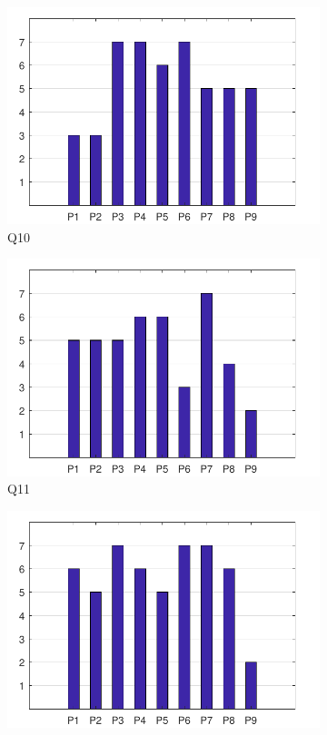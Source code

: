 \documentclass[english, 12pt, a4paper, pdftex, elec, utf8]{aaltothesis}
\begin{document}
\begin{figure}[h!]
	\centering
	\begin{subfigure}[b]{0.49\textwidth}
		\includegraphics[width=\textwidth]{T2_1.pdf}
		\caption*{Q10}
	\end{subfigure}
	\begin{subfigure}[b]{0.49\textwidth}
		\includegraphics[width=\textwidth]{T2_2.pdf}
		\caption*{Q11}
	\end{subfigure}
	\begin{subfigure}[b]{0.49\textwidth}
		\includegraphics[width=\textwidth]{T2_3.pdf}

\end{subfigure}
\end{figure}
\end{document}
